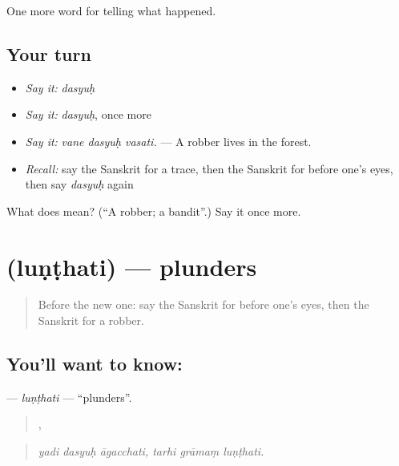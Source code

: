 \begin{grammarlens}[title={What you've built}]
One more word for telling what happened.
\end{grammarlens}

\subsection*{Your turn}
\begin{itemize}
\raggedright
  \item \emph{Say it:} \emph{dasyuḥ}
  \item \emph{Say it:} \emph{dasyuḥ}, once more
  \item \emph{Say it:} \emph{vane dasyuḥ vasati.} — A robber lives in the forest.
  \item \emph{Recall:} say the Sanskrit for a trace, then the Sanskrit for before one's eyes, then say \emph{dasyuḥ} again
\end{itemize}

\begin{tcolorbox}[breakable,colback=teal!4,colframe=teal!35!black,title={Before you move on}]
What does  mean? (\textquotedblleft{}A robber; a bandit\textquotedblright{}.) Say it once more.
\end{tcolorbox}
\section[\texorpdfstring{\sk{लुण्ठति} (luṇṭhati)}{लुण्ठति (luṇṭhati)}]{ (luṇṭhati) — plunders}

\label{lesson:SA-C290-lunthati}



\begin{quote}
Before the new one: say the Sanskrit for before one's eyes, then the Sanskrit for a robber.
\end{quote}

\subsection*{You'll want to know: }
\textbf{} — \emph{luṇṭhati} — \textquotedblleft{}plunders\textquotedblright{}.

\begin{quote}
  ,   
\end{quote}

\begin{quote}
\emph{yadi dasyuḥ āgacchati, tarhi grāmaṃ luṇṭhati.}
\end{quote}

